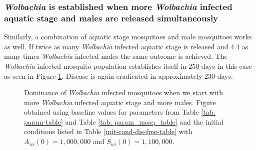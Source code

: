 \documentclass{ws-rv9x6}
\begin{document}

\subsubsection{\textit{Wolbachia} is established when more \textit{Wolbachia} infected  aquatic stage and males are released simultaneously}\label{moreaqmale}

Similarly, a combination of aquatic stage mosquitoes and male mosquitoes works as well. If twice as many \textit{Wolbachia} infected aquatic stage is released and 4.4 as many times \textit{Wolbachia} infected males the same outcome is achieved. The \textit{Wolbachia} infected mosquito population establishes itself in 250 days in this case as seen in Figure \ref{domwolbaqmales}. Disease is again eradicated in approximately 230 days.
\begin{figure}[H]
    \centering
    
    \caption{Dominance of \textit{Wolbachia} infected mosquitoes when we start with more \textit{Wolbachia} infected aquatic stage and more males. Figure  obtained using baseline values for parameters from Table \ref{tab: param-table} and Table \ref{tab: param_mosq_table} and the initial conditions listed in Table \ref{init-cond-dis-free-table} with $A_{wi}(0)=1,000,000$ and $S_{wi}(0)=1,100,000$.}
    \label{domwolbaqmales}
\end{figure}

\end{document}

